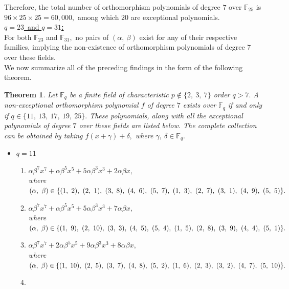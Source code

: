 \documentclass[12pt,a4wide, reqno]{amsart}
\newtheorem{theorem}{Theorem}[section]
\theoremstyle{definition}
\theoremstyle{remark}
\numberwithin{equation}{section}
\begin{document}
Therefore, the total number of orthomorphism polynomials of degree $7$ over $\mathbb{F}_{25}$ is $96\times 25\times 25=60,000,$ among which $20$ are exceptional polynomials.
 \vspace{0.5 cm}\\
\underline{\Large \textbf{$q=23$}~and \textbf{$q=31$:}}
\vspace{0.2cm}\\
For both $\mathbb{F}_{23}$ and $\mathbb{F}_{31},$ no pairs of $(\alpha,~\beta)$ exist for any of their respective families, implying the non-existence of orthomorphism polynomials of degree $7$ over these fields.
\vspace{0.2 cm}\\
We now summarize all of the preceding findings in the form of the following theorem.
\begin{theorem}\label{thm3.1}
    Let $\mathbb{F}_q$ be a finite field of characteristic $p\notin\{2,~3,~7\}$ order $q> 7.$ A non-exceptional orthomorphism polynomial $f$ of degree $7$ exists over $\mathbb{F}_q$ if and only if $q\in\{11,~13,~17,~19,~25\}.$ These polynomials, along with all the exceptional polynomials of degree $7$ over these fields are listed below. The complete collection can be obtained by taking $f(x+\gamma)+\delta,$ where $\gamma,~\delta\in\mathbb{F}_q.$
    \begin{itemize}
        \item 
        $q=11$
        \begin{enumerate}[label=\textup{(\arabic*)}]
        \item 
        $\alpha\beta^7x^7+\alpha\beta^5x^5+5\alpha\beta^3x^3+2\alpha\beta x,$ \\
        where $(\alpha,~\beta)\in\{(1,~2),~(2,~1),~(3,~8),~(4,~6),~(5,~7),~(1,~3),~(2,~7),~(3,~1),~(4,~9),\\~(5,~5)\}.$
        \item 
        $\alpha\beta^7x^7+\alpha\beta^5x^5+5\alpha\beta^3x^3+7\alpha\beta x,$\\ where $(\alpha,~\beta)\in\{(1,~9),~(2,~10),~(3,~3),~(4,~5),~(5,~4),~(1,~5),~(2,~8),~(3,~9),~(4,~4),\\~(5,~1)\}.$
        \item 
        $\alpha\beta^7x^7+2\alpha\beta^5x^5+9\alpha\beta^3x^3+8\alpha\beta x,$\\
        where $(\alpha,~\beta)\in\{(1,~10),~(2,~5),~(3,~7),~(4,~8),~(5,~2),~(1,~6),~(2,~3),~(3,~2),~(4,~7),\\~(5,~10)\}.$
        \item 

\end{enumerate}
\end{itemize}
\end{theorem}
\end{document}
